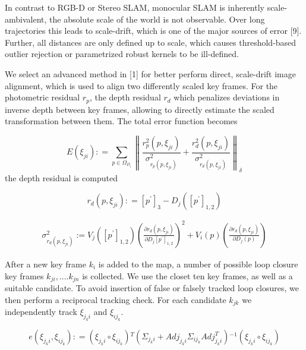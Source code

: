 In contrast to RGB-D or Stereo SLAM, monocular SLAM is inherently scale-ambivalent, the absolute scale of the world is not observable. Over long trajectories this leads to scale-drift, which is one of the major sources of error [9]. Further, all distances are only defined up to scale, which causes threshold-based outlier rejection or parametrized robust kernels to be ill-defined.

We select an advanced method in [1] for better perform direct, scale-drift image alignment, which is used to align two differently scaled key frames. For the photometric residual ${r_p}$, the depth residual ${r_d}$ which penalizes deviations in inverse depth between key frames, allowing to directly estimate the scaled transformation between them. The total error function becomes

\begin{equation}
E({\xi _{ji}}): = {\sum\limits_{p \in {\Omega _{{D_i}}}} {\left\| {\frac{{r_p^2(p,{\xi _{ji}})}}{{\sigma _{{r_p}(p,{\xi _{ji}})}^2}} + \frac{{r_d^2(p,{\xi _{ji}})}}{{\sigma _{{r_d}(p,{\xi _{ji}})}^2}}} \right\|} _\delta }
\end{equation}
the depth residual is computed

\begin{equation}
r_{d}(p,\xi _{ji}): = [p^{'}]_{3} - D_{j}([p^{'}]_{1,2})
\end{equation}

\begin{equation}
\begin{split}
\sigma_{r_{d}(p,\xi_{ji})} ^{2} :=V_{j}( [ p^{'} ]_{1,2} )  {\left( \frac {\partial r_{d}(p,\xi_{ji})} {\partial D_{j} \left[ p^{'} \right]_{1,2}}  \right)^{2}} + V_{i}(p) \left( \frac {\partial r_{d}(p,\xi_{ji})} {\partial D_{j}(p)} \right)
\end{split}
\end{equation}

After a new key frame ${k_i}$ is added to the map, a number of possible loop closure key frames ${k_{ji}},....{k_{jn}}$ is collected. We use the closet ten key frames, as well as a suitable candidate. To avoid insertion of false or falsely tracked loop closures, we then perform a reciprocal tracking check. For each candidate ${k_{jk}}$ we independently track ${\xi _{{j_k}i}}$ and ${\xi _{i{j_k}}}$.

\begin{equation}
e\!(\!{\xi _{{j_k}i}},{\xi _{i{j_k}}})\!: \!= \!{\!(\!{\xi _{{j_k}i}} \!\circ \!{\xi _{i{j_k}}})\!^T}{\!(\!{\Sigma _{{j_k}i}}\! +\! Ad{j_{{j_k}i}}{\Sigma _{i{j_k}}}Adj_{{j_k}i}^T\!)\!^{ - 1}}\!(\!{\xi _{{j_k}i}}\! \circ\! {\xi _{i{j_k}}}\!)
\end{equation}

